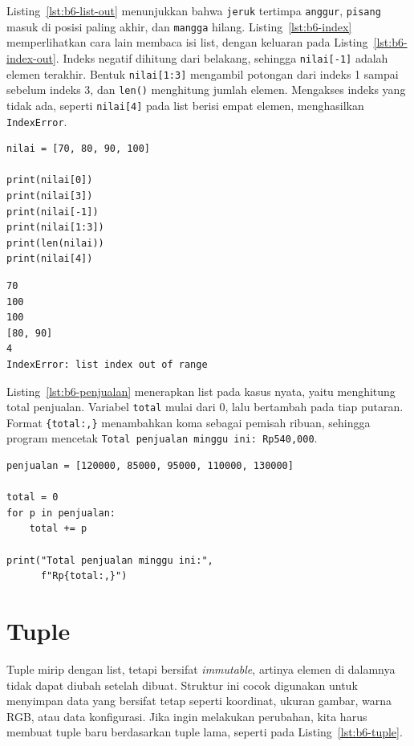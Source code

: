 Listing~\ref{lst:b6-list-out} menunjukkan bahwa \texttt{jeruk} tertimpa \texttt{anggur}, \texttt{pisang} masuk di posisi paling akhir, dan \texttt{mangga} hilang. Listing~\ref{lst:b6-index} memperlihatkan cara lain membaca isi list, dengan keluaran pada Listing~\ref{lst:b6-index-out}. Indeks negatif dihitung dari belakang, sehingga \texttt{nilai[-1]} adalah elemen terakhir. Bentuk \texttt{nilai[1:3]} mengambil potongan dari indeks 1 sampai sebelum indeks 3, dan \texttt{len()} menghitung jumlah elemen. Mengakses indeks yang tidak ada, seperti \texttt{nilai[4]} pada list berisi empat elemen, menghasilkan \texttt{IndexError}.

\begin{lstlisting}[style=PythonStyle, caption={Kode Python: indeks_list.py}, label={lst:b6-index}]
nilai = [70, 80, 90, 100]

print(nilai[0])
print(nilai[3])
print(nilai[-1])
print(nilai[1:3])
print(len(nilai))
print(nilai[4])
\end{lstlisting}

\begin{lstlisting}[language=bash, caption={Keluaran indeks_list.py}, label={lst:b6-index-out}]
70
100
100
[80, 90]
4
IndexError: list index out of range
\end{lstlisting}

Listing~\ref{lst:b6-penjualan} menerapkan list pada kasus nyata, yaitu menghitung total penjualan. Variabel \texttt{total} mulai dari 0, lalu bertambah pada tiap putaran. Format \texttt{\{total:,\}} menambahkan koma sebagai pemisah ribuan, sehingga program mencetak \texttt{Total penjualan minggu ini: Rp540,000}.


\begin{lstlisting}[style=PythonStyle, caption={Menghitung total penjualan dari list}, label={lst:b6-penjualan}]
penjualan = [120000, 85000, 95000, 110000, 130000]

total = 0
for p in penjualan:
    total += p

print("Total penjualan minggu ini:",
      f"Rp{total:,}")
\end{lstlisting}

\section{Tuple}
Tuple mirip dengan list, tetapi bersifat \textit{immutable}, artinya elemen di dalamnya tidak dapat diubah setelah dibuat. 
Struktur ini cocok digunakan untuk menyimpan data yang bersifat tetap seperti koordinat, ukuran gambar, warna RGB, atau data konfigurasi. 
Jika ingin melakukan perubahan, kita harus membuat tuple baru berdasarkan tuple lama, seperti pada Listing~\ref{lst:b6-tuple}.

